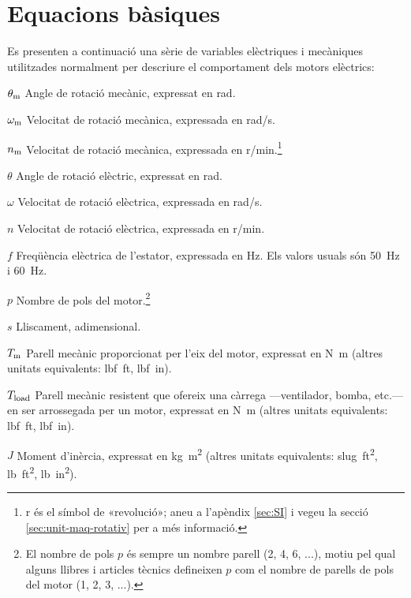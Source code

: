 \section{Equacions bàsiques}

Es presenten a continuació una sèrie de variables elèctriques i mecàniques utilitzades normalment per descriure el comportament dels motors elèctrics:

\begin{list}{}
   {\setlength{\labelwidth}{15mm} \setlength{\leftmargin}{20mm} \setlength{\labelsep}{5mm}}
   \item[$\theta_\mathrm{m}$] Angle de rotació mecànic, expressat en \unit{rad}.
   \item[$\omega_\mathrm{m}$] Velocitat de rotació mecànica, expressada en \unit{rad/s}.
   \item[$n_\mathrm{m}$] Velocitat de rotació mecànica, expressada en \unit{r/min}.\footnote{r és el símbol de «revolució»; aneu a l'apèndix \ref{sec:SI} i vegeu la secció \ref{sec:unit-maq-rotativ} per a més informació.}
   \item[$\theta$] Angle de rotació elèctric, expressat en \unit{rad}.
   \item[$\omega$] Velocitat de rotació elèctrica, expressada en \unit{rad/s}.
   \item[$n$] Velocitat de rotació elèctrica, expressada en \unit{r/min}.
   \item[$f$] Freqüència elèctrica de l'estator, expressada en \unit{Hz}. Els valors usuals són \qty{50}{Hz} i \qty{60}{Hz}.
   \item[$p$] Nombre de pols del motor.\footnote{El nombre de pols $p$  és sempre un nombre parell (2, 4, 6, ...), motiu pel qual alguns llibres i articles tècnics  defineixen $p$ com el nombre de parells de pols del motor       (1, 2, 3, ...).}
   \item[$s$] Lliscament, adimensional.
   \item[$T_\mathrm{m}$] Parell mecànic proporcionat per l'eix del motor, expressat en \unit{N.m} (altres unitats equivalents: \unit{lbf.ft}, \unit{lbf.in}).
   \item[$T_\mathrm{load}$] Parell mecànic resistent que ofereix una càrrega ---ventilador, bomba, etc.--- en ser arrossegada per un motor, expressat en \unit{N.m} (altres unitats equivalents: \unit{lbf.ft}, \unit{lbf.in}).
   \item[$J$] Moment d'inèrcia, expressat en \unit{kg.m^2} (altres unitats equivalents: \unit{slug.ft^2}, \unit{lb.ft^2}, \unit{lb.in^2}).

\end{list}
